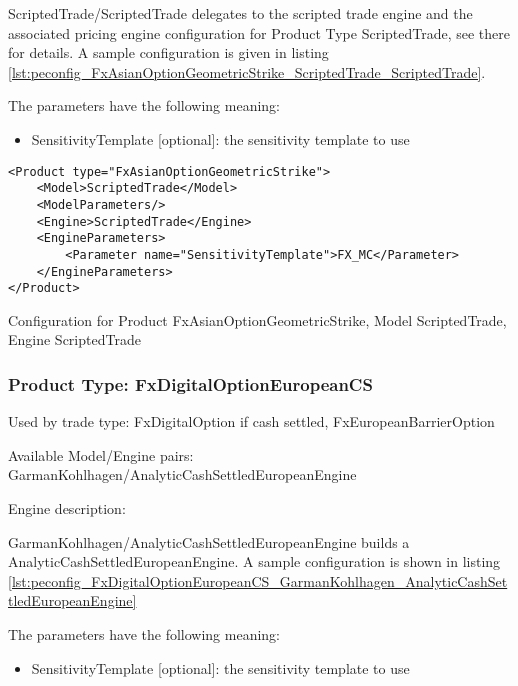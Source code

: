 ScriptedTrade/ScriptedTrade delegates to the scripted trade engine and the associated pricing engine configuration for
Product Type ScriptedTrade, see there for details. A sample configuration is given in listing
\ref{lst:peconfig_FxAsianOptionGeometricStrike_ScriptedTrade_ScriptedTrade}.

The parameters have the following meaning:

\begin{itemize}
\item SensitivityTemplate [optional]: the sensitivity template to use 
\end{itemize}

\begin{longlisting}
\begin{verbatim}
<Product type="FxAsianOptionGeometricStrike">
    <Model>ScriptedTrade</Model>
    <ModelParameters/>
    <Engine>ScriptedTrade</Engine>
    <EngineParameters>
        <Parameter name="SensitivityTemplate">FX_MC</Parameter>
    </EngineParameters>
</Product>
\end{verbatim}
\caption{Configuration for Product FxAsianOptionGeometricStrike, Model ScriptedTrade, Engine ScriptedTrade}
\label{lst:peconfig_FxAsianOptionGeometricStrike_ScriptedTrade_ScriptedTrade}
\end{longlisting}

\subsubsection{Product Type: FxDigitalOptionEuropeanCS}

Used by trade type: FxDigitalOption if cash settled, FxEuropeanBarrierOption

Available Model/Engine pairs: GarmanKohlhagen/AnalyticCashSettledEuropeanEngine

Engine description:

GarmanKohlhagen/AnalyticCashSettledEuropeanEngine builds a AnalyticCashSettledEuropeanEngine. A sample configuration is
shown in listing \ref{lst:peconfig_FxDigitalOptionEuropeanCS_GarmanKohlhagen_AnalyticCashSettledEuropeanEngine}

The parameters have the following meaning:

\begin{itemize}
\item SensitivityTemplate [optional]: the sensitivity template to use 
\end{itemize}

